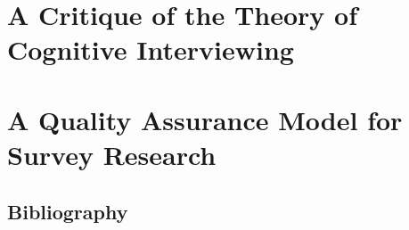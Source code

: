 \documentclass[11pt,twoside]{article}
\newcommand{\SR}{Survey Research}
\begin{document}
\begin{abstract}
Finally, the fourth model is The Collaborative Model.  This model is
driven by a closer and more realistic analysis of the nature of the
survey interview.  It demystifies aspects of the interview that the
other two models take for granted or ignore, such as the various
asymmetries involved in interviews, the fact that completion of a
survey questionnaire is the joint responsibility of the interviewer
and the respondent, and so forth.  It discards the fictions that are
at the core of the other models discussed.  Most critically, motivated
by considerations of the nature of discursive practice and the
production of meaning, it denies that survey interviewing involves
measurement.  In summary, this model recommends that survey
interviewing be construed as collaborative or joint action, and that
the demystified facts of the matter be openly acknowledged in the
conduct of interviews.  This means, among other things, that the field
interviewer should serve as an assistant to the respondent, rather
than a proxy for the researcher; that interviewer and respondent are
jointly responsible for completing the questionnaire; and that the
results of individual survey interviews should be viewed as a trace a
kind of dialog between the individuality of the particular respondent
and the stereotype presupposed by the questionnaire design.
\end{abstract}

\newpage
\section{A Critique of the Theory of Cognitive Interviewing}

\begin{abstract}
  
\end{abstract}

\newpage
\section{A Quality Assurance Model for \SR{}}

\begin{abstract}
abstract
\end{abstract}



\clearpage
\appendix
\begin{appendices}
\section{Bibliography}
\printbibliography[heading=none]
\end{appendices}
\end{document}
